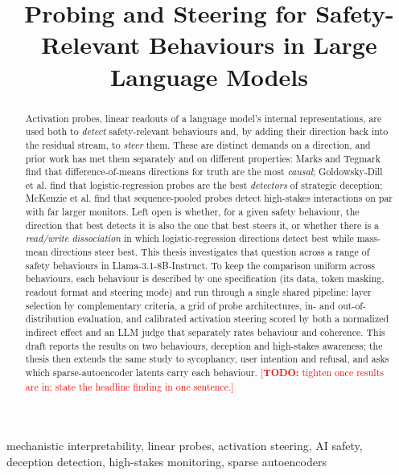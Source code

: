 \documentclass[conference]{IEEEtran}
\newcommand{\TODO}[1]{\textcolor{red}{[\textbf{TODO:} #1]}}
\begin{document}
\title{Probing and Steering for Safety-Relevant Behaviours 
in Large Language Models}

\author{
}

\maketitle

\begin{abstract}
Activation probes, linear readouts of a language model's internal
representations, are used both to \emph{detect} safety-relevant behaviours and,
by adding their direction back into the residual stream, to \emph{steer} them.
These are distinct demands on a direction, and prior work has met them
separately and on different properties: Marks and Tegmark find that
difference-of-means directions for truth are the most \emph{causal};
Goldowsky-Dill et al. find that logistic-regression probes are the best
\emph{detectors} of strategic deception; McKenzie et al. find that
sequence-pooled probes detect high-stakes interactions on par with far larger
monitors. Left open is whether, for a given safety behaviour, the direction that
best detects it is also the one that best steers it, or whether there is a
\emph{read/write dissociation} in which logistic-regression directions detect
best while mass-mean directions steer best. This thesis investigates that
question across a range of safety behaviours in Llama-3.1-8B-Instruct. To keep
the comparison uniform across behaviours, each behaviour is described by one
specification (its data, token masking, readout format and steering mode) and
run through a single shared pipeline: layer selection by complementary criteria,
a grid of probe architectures, in- and out-of-distribution evaluation, and
calibrated activation steering scored by both a normalized indirect effect and
an LLM judge that separately rates behaviour and coherence. This draft reports
the results on two behaviours, deception and high-stakes awareness; the thesis
then extends the same study to sycophancy, user intention and refusal, and asks
which sparse-autoencoder latents carry each behaviour.
\TODO{tighten once results are in; state the headline finding in one sentence.}
\end{abstract}

\begin{IEEEkeywords}
mechanistic interpretability, linear probes, activation steering, AI safety,
deception detection, high-stakes monitoring, sparse autoencoders
\end{IEEEkeywords}
\end{document}
